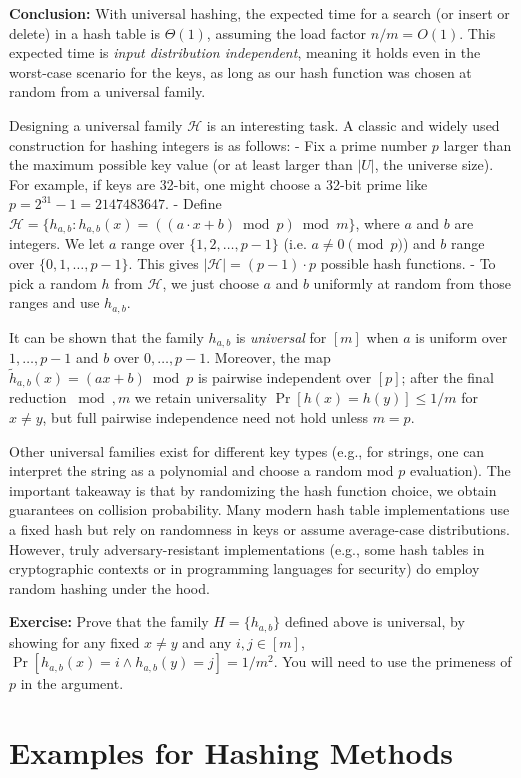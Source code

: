\documentclass[11pt]{article}
\begin{document}
\textbf{Conclusion:} With universal hashing, the expected time for a search (or insert or delete) in a hash table is $\Theta(1)$, assuming the load factor $n/m = O(1)$. This expected time is \emph{input distribution independent}, meaning it holds even in the worst-case scenario for the keys, as long as our hash function was chosen at random from a universal family.

Designing a universal family $\mathcal{H}$ is an interesting task. A classic and widely used construction for hashing integers is as follows:
- Fix a prime number $p$ larger than the maximum possible key value (or at least larger than $|U|$, the universe size). For example, if keys are 32-bit, one might choose a 32-bit prime like $p = 2^{31}-1 = 2147483647$.
- Define $\mathcal{H} = \{ h_{a,b} : h_{a,b}(x) = ((a \cdot x + b) \bmod p) \bmod m \}$, where $a$ and $b$ are integers. We let $a$ range over $\{1,2,\ldots, p-1\}$ (i.e. $a \neq 0 \pmod p$) and $b$ range over $\{0,1,\ldots,p-1\}$. This gives $|\mathcal{H}| = (p-1)\cdot p$ possible hash functions.
- To pick a random $h$ from $\mathcal{H}$, we just choose $a$ and $b$ uniformly at random from those ranges and use $h_{a,b}$.

It can be shown that the family ${h_{a,b}}$ is \emph{universal} for $[m]$ when $a$ is uniform over ${1,\dots,p-1}$ and $b$ over ${0,\dots,p-1}$. Moreover, the map $\tilde h_{a,b}(x)=(ax+b)\bmod p$ is pairwise independent over $[p]$; after the final reduction $\bmod, m$ we retain universality $\Pr[h(x)=h(y)]\le 1/m$ for $x\ne y$, but full pairwise independence need not hold unless $m=p$.

Other universal families exist for different key types (e.g., for strings, one can interpret the string as a polynomial and choose a random mod $p$ evaluation). The important takeaway is that by randomizing the hash function choice, we obtain guarantees on collision probability. Many modern hash table implementations use a fixed hash but rely on randomness in keys or assume average-case distributions. However, truly adversary-resistant implementations (e.g., some hash tables in cryptographic contexts or in programming languages for security) do employ random hashing under the hood.

\textbf{Exercise:} Prove that the family $H = \{h_{a,b}\}$ defined above is universal, by showing for any fixed $x \neq y$ and any $i,j \in [m]$, $\Pr[h_{a,b}(x)=i \wedge h_{a,b}(y)=j] = 1/m^2$. You will need to use the primeness of $p$ in the argument.


\section{Examples for Hashing Methods}
\end{document}
